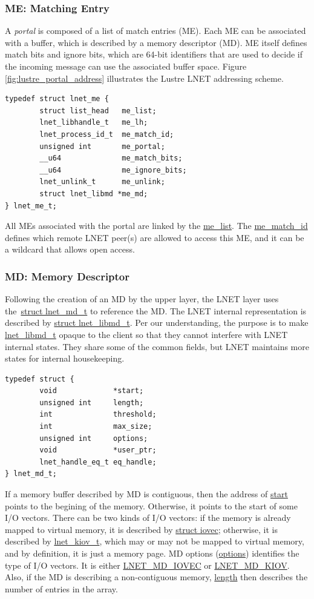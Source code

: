\subsubsection*{ME: Matching Entry}

A \textit{portal} is composed of a list of match entries (ME). Each ME can be
associated with a buffer, which is described by a memory descriptor (MD). ME
itself defines match bits and ignore bits, which are 64-bit identifiers that
are used to decide if the incoming message can use the associated buffer space.
Figure \ref{fig:lustre_portal_address} illustrates the Lustre LNET addressing
scheme.


\begin{Verbatim}
typedef struct lnet_me {
        struct list_head   me_list;
        lnet_libhandle_t   me_lh;
        lnet_process_id_t  me_match_id;
        unsigned int       me_portal;
        __u64              me_match_bits;
        __u64              me_ignore_bits;
        lnet_unlink_t      me_unlink;
        struct lnet_libmd *me_md;
} lnet_me_t;
\end{Verbatim}

All MEs associated with the portal are linked by the \url{me_list}.  The
\url{me_match_id} defines which remote LNET peer(s) are allowed to access this
ME, and it can be a wildcard that allows open access.

\subsubsection*{MD: Memory Descriptor}

Following the creation of an MD by the upper layer, the LNET layer uses
the~\url{struct lnet_md_t} to reference the MD. The LNET internal
representation is described by \url{struct lnet_libmd_t}.  Per our
understanding, the purpose is to make \url{lnet_libmd_t} opaque to the client
so that they cannot interfere with LNET internal states. They share some of the
common fields, but LNET maintains more states for internal housekeeping.

\begin{Verbatim}
typedef struct {
        void             *start;
        unsigned int     length;
        int              threshold;
        int              max_size;
        unsigned int     options;
        void             *user_ptr;
        lnet_handle_eq_t eq_handle;
} lnet_md_t;
\end{Verbatim}

If a memory buffer described by MD is contiguous, then the address of
\url{start} points to the begining of the memory. Otherwise, it points to the
start of some I/O vectors.  There can be two kinds of I/O vectors: if the
memory is already mapped to virtual memory, it is described by \url{struct
iovec}; otherwise, it is described by \url{lnet_kiov_t}, which may or may not be
mapped to virtual memory, and by definition, it is just a memory page.  MD
options (\url{options}) identifies the type of I/O vectors. It is either
\url{LNET_MD_IOVEC} or \url{LNET_MD_KIOV}. Also, if the MD is describing a
non-contiguous memory, \url{length} then describes the number of entries in the
array.

